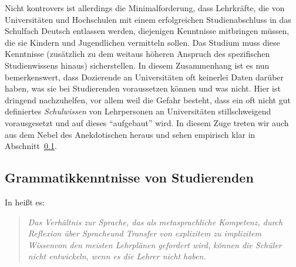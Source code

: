 Nicht kontrovers ist allerdings die Minimalforderung, dass Lehrkräfte, die von Universitäten und Hochschulen mit einem erfolgreichen Studienabschluss in das Schulfach Deutsch entlassen werden, diejenigen Kenntnisse mitbringen müssen, die sie Kindern und Jugendlichen vermitteln sollen.
Das Studium muss diese Kenntnisse (zusätzlich zu dem weitaus höheren Anspruch des spezifischen Studienwissens hinaus) sicherstellen.
In diesem Zusammenhang ist es nun bemerkenswert, dass Dozierende an Universitäten oft keinerlei Daten darüber haben, was sie bei Studierenden voraussetzen können und was nicht.
Hier ist dringend nachzuhelfen, vor allem weil die Gefahr besteht, dass ein oft nicht gut definiertes \textit{Schulwissen} von Lehrpersonen an Universitäten stillschweigend vorausgesetzt und auf dieses "`aufgebaut"' wird.
In diesem Zuge treten wir auch aus dem Nebel des Anekdotischen heraus und sehen empirisch klar in Abschnitt~\ref{sec:grammatikkentnissevonstudierenden}.


\subsection{Grammatikkenntnisse von Studierenden}
\label{sec:grammatikkentnissevonstudierenden}

In \citet[23]{Eisenberg2004} heißt es:

\begin{quote}
  \textit{Das Verhältnis zur Sprache, das als \glq metasprachliche Kompetenz\grq, durch \glq Reflexion über Sprache\grq und \glq Transfer von explizitem zu implizitem Wissen\grq von den meisten Lehrplänen gefordert wird, können die Schüler nicht entwickeln, wenn es die Lehrer nicht haben.}
\end{quote}

